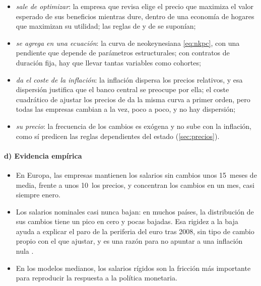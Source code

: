 \documentclass[11pt]{article}
\begin{document}
\begin{anotaciones}
\begin{itemize}
\begin{itemize}
  \item \emph{sale de optimizar}: la empresa que revisa elige el precio que maximiza el valor esperado de sus beneficios mientras dure, dentro de una economía de hogares que maximizan su utilidad; las reglas de  y de  se suponían;
  \item \emph{se agrega en una ecuación}: la curva de  neokeynesiana \eqref{eq:nkpc}, con una pendiente que depende de parámetros estructurales; con contratos de duración fija, hay que llevar tantas variables como cohortes;
  \item \emph{da el coste de la inflación}: la inflación dispersa los precios relativos, y esa dispersión justifica que el banco central se preocupe por ella; el coste cuadrático de ajustar los precios de \textcite{Rotemberg1982Monopolistic} da la misma curva a primer orden, pero todas las empresas cambian a la vez, poco a poco, y no hay dispersión;
  \item \emph{su precio}: la frecuencia de los cambios es exógena y no sube con la inflación, como sí predicen las reglas dependientes del estado (\ref{sec:precios}).
  \end{itemize}
\end{itemize}
\begin{figuracaja}
\caption{Cómo se fijan los precios en cada modelo ante una subida permanente del dinero}\label{fig:reglas-precios}
\end{figuracaja}
\end{anotaciones}

\paragraph{d) Evidencia empírica}
\begin{itemize}
\item En Europa, las empresas mantienen los salarios sin cambios unos 15~meses de media, frente a unos 10~los precios, y concentran los cambios en un mes, casi siempre enero\nocite{DruantEtAl2009How}.
\item Los salarios nominales casi nunca bajan: en muchos países, la distribución de sus cambios tiene un pico en cero y pocas bajadas\nocite{DickensEtAl2007How}. Esa rigidez a la baja ayuda a explicar el paro de la periferia del euro tras 2008, sin tipo de cambio propio con el que ajustar\nocite{SchmittGroheUribe2016Downward}, y es una razón para no apuntar a una inflación nula\nocite{AkerlofDickensPerry1996} .
\item En los modelos medianos, los salarios rígidos son la fricción más importante para reproducir la respuesta a la política monetaria\nocite{ChristianoEichenbaumEvans2005}.
\end{itemize}
\end{document}
